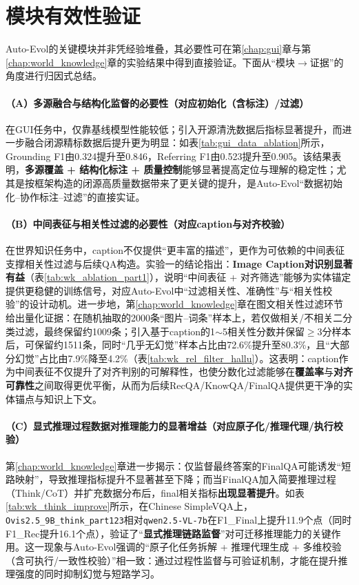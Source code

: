 \section{模块有效性验证}
Auto-Evol的关键模块并非凭经验堆叠，其必要性可在第\ref{chap:gui}章与第\ref{chap:world_knowledge}章的实验结果中得到直接验证。下面从“模块$\rightarrow$证据”的角度进行归因式总结。

\paragraph{（A）多源融合与结构化监督的必要性（对应初始化（含标注）/过滤）}
在GUI任务中，仅靠基线模型性能较低；引入开源清洗数据后指标显著提升，而进一步融合闭源精标数据后提升更为明显：如表\ref{tab:gui_data_ablation}所示，Grounding F1由0.324提升至0.846，Referring F1由0.523提升至0.905。该结果表明，\textbf{多源覆盖 + 结构化标注 + 质量控制}能够显著提高定位与理解的稳定性；尤其是按框架构造的闭源高质量数据带来了更关键的提升，是Auto-Evol“数据初始化--协作标注--过滤”的直接实证。

\paragraph{（B）中间表征与相关性过滤的必要性（对应caption与对齐校验）}
在世界知识任务中，caption不仅提供“更丰富的描述”，更作为可依赖的中间表征支撑相关性过滤与后续QA构造。实验一的结论指出：\textbf{Image Caption对识别显著有益}（表\ref{tab:wk_ablation_part1}），说明“中间表征 + 对齐筛选”能够为实体锚定提供更稳健的训练信号，对应Auto-Evol中“过滤相关性、准确性”与“相关性校验”的设计动机。进一步地，第\ref{chap:world_knowledge}章在图文相关性过滤环节给出量化证据：在随机抽取的2000条“图片--词条”样本上，若仅做相关/不相关二分类过滤，最终保留约1009条；引入基于caption的1$\sim$5相关性分数并保留$\ge$3分样本后，可保留约1511条，同时“几乎无幻觉”样本占比由72.6\%提升至80.3\%，且“大部分幻觉”占比由7.9\%降至4.2\%（表\ref{tab:wk_rel_filter_hallu}）。这表明：caption作为中间表征不仅提升了对齐判别的可解释性，也使分数化过滤能够在\textbf{覆盖率}与\textbf{对齐可靠性}之间取得更优平衡，从而为后续RecQA/KnowQA/FinalQA提供更干净的实体锚点与知识上下文。

\paragraph{（C）显式推理过程数据对推理能力的显著增益（对应原子化/推理代理/执行校验）}
第\ref{chap:world_knowledge}章进一步揭示：仅监督最终答案的FinalQA可能诱发“短路映射”，导致推理指标提升不显著甚至下降；而当FinalQA加入简要推理过程（Think/CoT）并扩充数据分布后，final相关指标\textbf{出现显著提升}。如表\ref{tab:wk_think_improve}所示，在Chinese SimpleVQA上，\texttt{Ovis2.5\_9B\_think\_part123}相对\texttt{qwen2.5-VL-7b}在F1\_Final上提升11.9个点（同时F1\_Rec提升16.1个点），验证了“\textbf{显式推理链路监督}”对可迁移推理能力的关键作用。这一现象与Auto-Evol强调的“原子化任务拆解 + 推理代理生成 + 多维校验（含可执行/一致性校验）”相一致：通过过程性监督与可验证机制，才能在提升推理强度的同时抑制幻觉与短路学习。

